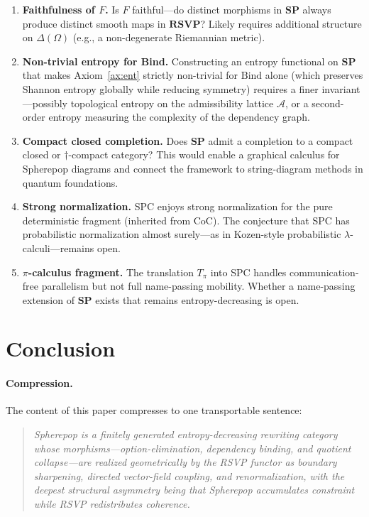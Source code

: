 \documentclass[12pt, a4paper]{article}
\theoremstyle{definition}
\theoremstyle{remark}
\newcommand{\SP}{\mathbf{SP}}
\newcommand{\RSVP}{\mathbf{RSVP}}
\newcommand{\Bind}{\mathrm{Bind}}
\begin{document}
\begin{enumerate}
  \item \textbf{Faithfulness of $F$.} Is $F$ faithful—do distinct morphisms in $\SP$
    always produce distinct smooth maps in $\RSVP$? Likely requires additional structure
    on $\Delta(\Omega)$ (e.g., a non-degenerate Riemannian metric).

  \item \textbf{Non-trivial entropy for Bind.} Constructing an entropy functional on $\SP$
    that makes Axiom~\ref{ax:ent} strictly non-trivial for $\Bind$ alone (which preserves
    Shannon entropy globally while reducing symmetry) requires a finer invariant—possibly
    topological entropy on the admissibility lattice $\mathcal{A}$, or a second-order
    entropy measuring the complexity of the dependency graph.

  \item \textbf{Compact closed completion.} Does $\SP$ admit a completion to a compact
    closed or $\dagger$-compact category? This would enable a graphical calculus for
    Spherepop diagrams and connect the framework to string-diagram methods in quantum
    foundations.

  \item \textbf{Strong normalization.} SPC enjoys strong normalization for the pure
    deterministic fragment (inherited from CoC). The conjecture that SPC has probabilistic
    normalization almost surely—as in Kozen-style probabilistic $\lambda$-calculi—remains
    open.

  \item \textbf{$\pi$-calculus fragment.} The translation $T_\pi$ into SPC handles
    communication-free parallelism but not full name-passing mobility. Whether a
    name-passing extension of $\SP$ exists that remains entropy-decreasing is open.
\end{enumerate}

\section{Conclusion}
\label{sec:conclusion}

\paragraph{Compression.}
The content of this paper compresses to one transportable sentence:

\begin{quote}
\emph{Spherepop is a finitely generated entropy-decreasing rewriting category whose
morphisms—option-elimination, dependency binding, and quotient collapse—are realized
geometrically by the RSVP functor as boundary sharpening, directed vector-field
coupling, and renormalization, with the deepest structural asymmetry being that
Spherepop accumulates constraint while RSVP redistributes coherence.}
\end{quote}
\end{document}

